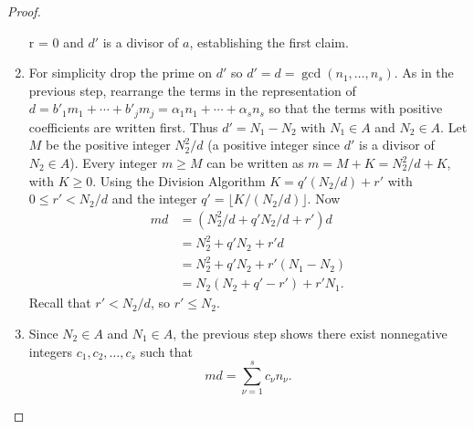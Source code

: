 \documentclass[12pt]{article}
\begin{document}
\begin{proof}
\begin{enumerate}
            r = 0 \) and \( d' \) is a divisor of \( a \), establishing
            the first claim.
        \item
            For simplicity drop the prime on \( d' \) so \( d' = d =
            \gcd(n_1, \dots, n_s) \).  As in the previous step,
            rearrange the terms in the representation of \( d = b'_1 m_1
            + \cdots + b'_j m_j = \alpha_1 n_1 + \cdots + \alpha_s n_s \)
            so that the terms with positive coefficients are written
            first. Thus \( d' = N_1 - N_2 \) with \( N_1 \in A \) and \(
            N_2 \in A \).  Let \( M \) be the positive integer \( N_2^2/d
            \) (a positive integer since \( d' \) is a divisor of \( N_{2}\in
            A \)). Every integer \( m \ge M \) can be written as \( m =
            M + K = N_2^2/d + K \), with \( K \ge 0 \).  Using the
            Division Algorithm \( K = q' (N_2/d) + r' \) with \( 0 \le
            r' < N_2/d \) and the integer \( q' = \lfloor K/(N_2/d)
            \rfloor \).  Now
            \begin{align*}
                md &= (N_2^2/d + q' N_2/d + r') d \\
                &= N_2^2 + q'N_2 + r'd \\
                &= N_2^2 + q'N_2 + r'(N_1 - N_2) \\
                &= N_2(N_2 + q' -r') + r' N_1.
            \end{align*}
            Recall that \( r' < N_2/d \), so \( r' \le N_2 \).
        \item
            Since \( N_2 \in A \) and \( N_1 \in A \), the previous step
            shows there exist nonnegative integers \( c_1, c_2, \dots, c_s
            \) such that
            \[
                md = \sum\limits_{\nu=1}^s c_\nu n_\nu.
            \]
    \end{enumerate}
\end{proof}
\end{document}
